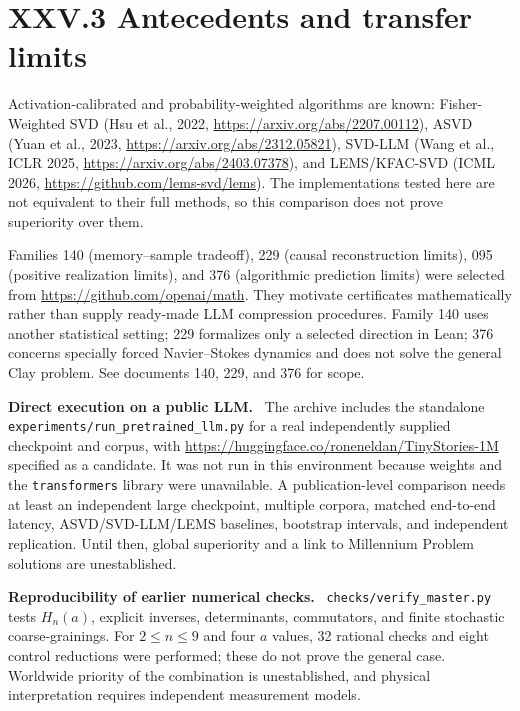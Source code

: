 \documentclass[11pt,a4paper,oneside]{book}
\newcommand{\note}[1]{\par\medskip\noindent\textbf{#1}\ }
\begin{document}
\section*{XXV.3 Antecedents and transfer limits}
Activation-calibrated and probability-weighted algorithms are known: Fisher-Weighted SVD (Hsu et al., 2022, \url{https://arxiv.org/abs/2207.00112}), ASVD (Yuan et al., 2023, \url{https://arxiv.org/abs/2312.05821}), SVD-LLM (Wang et al., ICLR 2025, \url{https://arxiv.org/abs/2403.07378}), and LEMS/KFAC-SVD (ICML 2026, \url{https://github.com/lems-svd/lems}). The implementations tested here are not equivalent to their full methods, so this comparison does not prove superiority over them.

Families 140 (memory--sample tradeoff), 229 (causal reconstruction limits), 095 (positive realization limits), and 376 (algorithmic prediction limits) were selected from \url{https://github.com/openai/math}. They motivate certificates mathematically rather than supply ready-made LLM compression procedures. Family 140 uses another statistical setting; 229 formalizes only a selected direction in Lean; 376 concerns specially forced Navier--Stokes dynamics and does not solve the general Clay problem. See documents 140, 229, and 376 for scope.
\note{Direct execution on a public LLM.} The archive includes the standalone \texttt{experiments/run\_pretrained\_llm.py} for a real independently supplied checkpoint and corpus, with \url{https://huggingface.co/roneneldan/TinyStories-1M} specified as a candidate. It was not run in this environment because weights and the \texttt{transformers} library were unavailable. A publication-level comparison needs at least an independent large checkpoint, multiple corpora, matched end-to-end latency, ASVD/SVD-LLM/LEMS baselines, bootstrap intervals, and independent replication. Until then, global superiority and a link to Millennium Problem solutions are unestablished.
\note{Reproducibility of earlier numerical checks.} \texttt{checks/verify\_master.py} tests $H_n(a)$, explicit inverses, determinants, commutators, and finite stochastic coarse-grainings. For $2\le n\le9$ and four $a$ values, 32 rational checks and eight control reductions were performed; these do not prove the general case. Worldwide priority of the combination is unestablished, and physical interpretation requires independent measurement models.
\setcounter{equation}{104}


\end{document}
